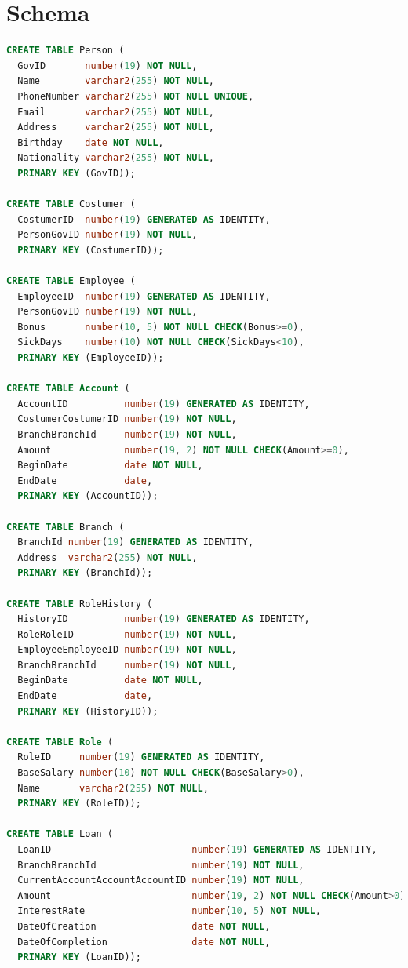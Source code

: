 \documentclass[a4paper, 10pt]{article}
\begin{document}
\section{Schema}
\begin{lstlisting}[language=SQL]
CREATE TABLE Person (
  GovID       number(19) NOT NULL, 
  Name        varchar2(255) NOT NULL, 
  PhoneNumber varchar2(255) NOT NULL UNIQUE, 
  Email       varchar2(255) NOT NULL, 
  Address     varchar2(255) NOT NULL, 
  Birthday    date NOT NULL, 
  Nationality varchar2(255) NOT NULL, 
  PRIMARY KEY (GovID));

CREATE TABLE Costumer (
  CostumerID  number(19) GENERATED AS IDENTITY, 
  PersonGovID number(19) NOT NULL, 
  PRIMARY KEY (CostumerID));

CREATE TABLE Employee (
  EmployeeID  number(19) GENERATED AS IDENTITY, 
  PersonGovID number(19) NOT NULL, 
  Bonus       number(10, 5) NOT NULL CHECK(Bonus>=0), 
  SickDays    number(10) NOT NULL CHECK(SickDays<10), 
  PRIMARY KEY (EmployeeID));

CREATE TABLE Account (
  AccountID          number(19) GENERATED AS IDENTITY, 
  CostumerCostumerID number(19) NOT NULL, 
  BranchBranchId     number(19) NOT NULL, 
  Amount             number(19, 2) NOT NULL CHECK(Amount>=0), 
  BeginDate          date NOT NULL, 
  EndDate            date, 
  PRIMARY KEY (AccountID));

CREATE TABLE Branch (
  BranchId number(19) GENERATED AS IDENTITY, 
  Address  varchar2(255) NOT NULL, 
  PRIMARY KEY (BranchId));

CREATE TABLE RoleHistory (
  HistoryID          number(19) GENERATED AS IDENTITY, 
  RoleRoleID         number(19) NOT NULL, 
  EmployeeEmployeeID number(19) NOT NULL, 
  BranchBranchId     number(19) NOT NULL, 
  BeginDate          date NOT NULL, 
  EndDate            date, 
  PRIMARY KEY (HistoryID));

CREATE TABLE Role (
  RoleID     number(19) GENERATED AS IDENTITY, 
  BaseSalary number(10) NOT NULL CHECK(BaseSalary>0), 
  Name       varchar2(255) NOT NULL, 
  PRIMARY KEY (RoleID));

CREATE TABLE Loan (
  LoanID                         number(19) GENERATED AS IDENTITY, 
  BranchBranchId                 number(19) NOT NULL, 
  CurrentAccountAccountAccountID number(19) NOT NULL, 
  Amount                         number(19, 2) NOT NULL CHECK(Amount>0), 
  InterestRate                   number(10, 5) NOT NULL, 
  DateOfCreation                 date NOT NULL, 
  DateOfCompletion               date NOT NULL, 
  PRIMARY KEY (LoanID));


\end{lstlisting}
\end{document}
